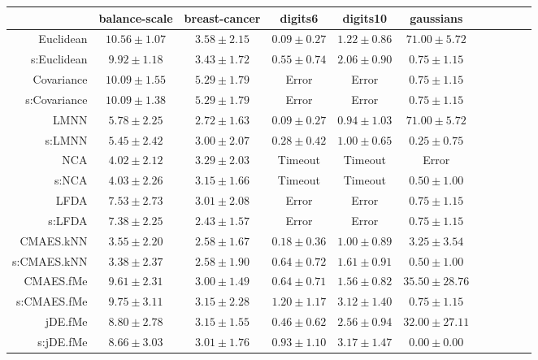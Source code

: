 \begin{table}[ht] \centering
{\small\renewcommand{\arraystretch}{0.95}
\setlength{\tabcolsep}{1pt}
\begin{tabular}{rcccccccccc}
\toprule


& \multicolumn{1}{c}{balance-scale} & \multicolumn{1}{c}{breast-cancer} & \multicolumn{1}{c}{digits6} & \multicolumn{1}{c}{digits10} & \multicolumn{1}{c}{gaussians} \\ 
\midrule
Euclidean & $10.56\pm1.07$ & $3.58\pm2.15$ & $\bm{0.09\pm0.27}$ & $1.22\pm0.86$ & $71.00\pm5.72$ \\
s:Euclidean & $9.92\pm1.18$ & $3.43\pm1.72$ & $0.55\pm0.74$ & $2.06\pm0.90$ & $0.75\pm1.15$ \\
Covariance & $10.09\pm1.55$ & $5.29\pm1.79$ & Error  & Error  & $0.75\pm1.15$ \\
s:Covariance & $10.09\pm1.38$ & $5.29\pm1.79$ & Error  & Error  & $0.75\pm1.15$ \\
LMNN & $5.78\pm2.25$ & $2.72\pm1.63$ & $\bm{0.09\pm0.27}$ & $\bm{0.94\pm1.03}$ & $71.00\pm5.72$ \\
s:LMNN & $5.45\pm2.42$ & $3.00\pm2.07$ & $0.28\pm0.42$ & $1.00\pm0.65$ & $0.25\pm0.75$ \\
NCA & $4.02\pm2.12$ & $3.29\pm2.03$ & Timeout  & Timeout  & Error  \\
s:NCA & $4.03\pm2.26$ & $3.15\pm1.66$ & Timeout  & Timeout  & $0.50\pm1.00$ \\
LFDA & $7.53\pm2.73$ & $3.01\pm2.08$ & Error  & Error  & $0.75\pm1.15$ \\
s:LFDA & $7.38\pm2.25$ & $\bm{2.43\pm1.57}$ & Error  & Error  & $0.75\pm1.15$ \\
CMAES.kNN & $3.55\pm2.20$ & $2.58\pm1.67$ & $0.18\pm0.36$ & $1.00\pm0.89$ & $3.25\pm3.54$ \\
s:CMAES.kNN & $\bm{3.38\pm2.37}$ & $2.58\pm1.90$ & $0.64\pm0.72$ & $1.61\pm0.91$ & $0.50\pm1.00$ \\
CMAES.fMe & $9.61\pm2.31$ & $3.00\pm1.49$ & $0.64\pm0.71$ & $1.56\pm0.82$ & $35.50\pm28.76$ \\
s:CMAES.fMe & $9.75\pm3.11$ & $3.15\pm2.28$ & $1.20\pm1.17$ & $3.12\pm1.40$ & $0.75\pm1.15$ \\
jDE.fMe & $8.80\pm2.78$ & $3.15\pm1.55$ & $0.46\pm0.62$ & $2.56\pm0.94$ & $32.00\pm27.11$ \\
s:jDE.fMe & $8.66\pm3.03$ & $3.01\pm1.76$ & $0.93\pm1.10$ & $3.17\pm1.47$ & $\bm{0.00\pm0.00}$ \\

\end{tabular}}
\end{table}
